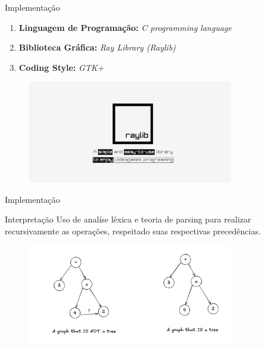 \documentclass[11pt]{beamer}
\begin{document}
\begin{frame}{Implementação}
    \begin{center}
        \begin{enumerate}
            \item \textbf{Linguagem de Programação:} \textit{C programming language}
            \item \textbf{Biblioteca Gráfica:} \textit{Ray Library (Raylib)}
            \item \textbf{Coding Style:} \textit{GTK+}
        \end{enumerate}
    \end{center}
    \begin{figure}[htb]
        \centering
        \includegraphics[width=0.8\textwidth]{imagens/raylib.png}
    \end{figure}
\end{frame}

\begin{frame}{Implementação}
    \begin{block}{Interpretação}
        Uso de analíse léxica e teoria de parsing para realizar recursivamente as operações, respeitado suas respectivas precedências.
    \end{block}

    \begin{figure}[htb]
        \centering
        \includegraphics[width=0.8\textwidth]{imagens/graph.png}
    \end{figure}
    
\end{frame}
\end{document}
